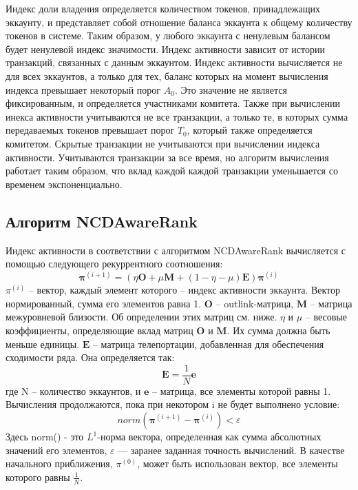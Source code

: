 \documentclass[a4paper,12pt]{article}
\begin{document}
Индекс доли владения определяется количеством токенов, принадлежащих эккаунту, и представляет собой отношение баланса эккаунта к общему количеству токенов в системе. Таким образом, у любого эккаунта с ненулевым балансом будет ненулевой индекс значимости. Индекс активности зависит от истории транзакций, связанных с данным эккаунтом. Индекс активности вычисляется не для всех эккаунтов, а только для тех, баланс которых на момент вычисления индекса превышает некоторый порог $A_0$. Это значение не является фиксированным, и определяется участниками комитета. Также при вычислении инекса активности учитываются не все транзакции, а только те, в которых сумма передаваемых токенов превышает порог $T_0$, который также определяется комитетом. Скрытые транзакции не учитываются при вычислении индекса активности. Учитываются транзакции за все время, но алгоритм вычисления работает таким образом, что вклад каждой каждой транзакции уменьшается со временем экспоненциально.

\subsection{Алгоритм NCDAwareRank}
Индекс активности в соответствии с алгоритмом NCDAwareRank вычисляется с помощью следующего рекуррентного соотношения:
$$
\boldsymbol{\pi}^{(i+1)} = ( \eta \boldsymbol{O} + \mu \boldsymbol{M} + ( 1 - \eta - \mu ) \boldsymbol{E} ) \boldsymbol{\pi}^{(i)}
$$
$\pi^{(i)}$ -- вектор, каждый элемент которого -- индекс активности эккаунта. Вектор нормированный, сумма его элементов равна 1.
$\boldsymbol{O}$ -- outlink-матрица, $\boldsymbol{M}$ – матрица межуровневой близости. Об определении этих матриц см. ниже.
$\eta$ и $\mu$ – весовые коэффициенты, определяющие вклад матриц $\boldsymbol{O}$ и $\boldsymbol{M}$. Их сумма должна быть меньше единицы.
$\boldsymbol{E}$ -- матрица телепортации, добавленная для обеспечения сходимости ряда. Она определяется так:
$$
\boldsymbol{E}=\frac{1}{N}\boldsymbol{e}
$$
где N -- количество эккаунтов, и $\boldsymbol{e}$ -- матрица, все элементы которой равны 1.
Вычисления продолжаются, пока при некотором i не будет выполнено условие:
$$
norm(\boldsymbol{\pi}^{(i+1)}-\boldsymbol{\pi}^{(i)})<\varepsilon
$$
Здесь norm() - это $L^1$-норма вектора, определенная как сумма абсолютных значений его элементов, $\varepsilon$ — заранее заданная точность вычислений. 
В качестве начального приближения, $\pi^{(0)}$, может быть использован вектор, все элементы которого равны $\frac{1}{N}$.
\end{document}
